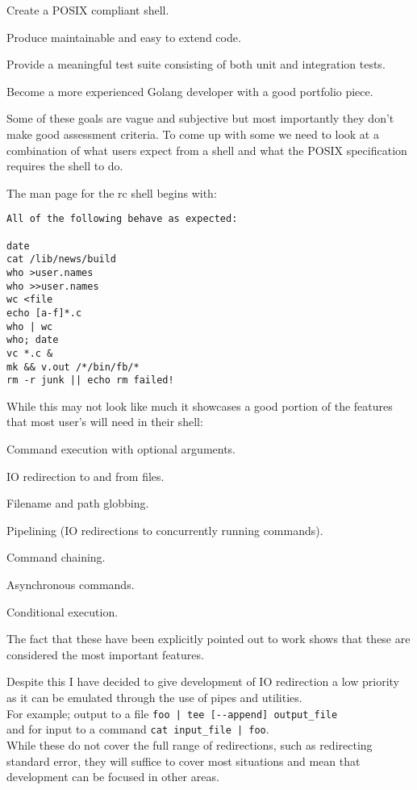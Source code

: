 \begin{itemize*}
    \item Create a POSIX\cite{POSIX-SHELL-STANDARD} compliant shell.
    \item Produce maintainable and easy to extend code.
    \item Provide a meaningful test suite consisting of both unit and integration tests.
    \item Become a more experienced Golang developer with a good portfolio piece.
\end{itemize*}

Some of these goals are vague and subjective but most importantly they don't make good assessment criteria.
To come up with some we need to look at a combination of what users expect from a shell and what the POSIX specification requires the shell to do.

The man page for the rc shell begins with:
\begin{lstlisting}
All of the following behave as expected:

date
cat /lib/news/build
who >user.names
who >>user.names
wc <file
echo [a-f]*.c
who | wc
who; date
vc *.c &
mk && v.out /*/bin/fb/*
rm -r junk || echo rm failed!
\end{lstlisting}

While this may not look like much it showcases a good portion of the features that most user's will need in their shell:
\begin{itemize*}
    \item Command execution with optional arguments.
    \item IO redirection to and from files.
    \item Filename and path globbing.
    \item Pipelining (IO redirections to concurrently running commands).
    \item Command chaining.
    \item Asynchronous commands.
    \item Conditional execution.
\end{itemize*}
The fact that these have been explicitly pointed out to work shows that these are considered the most important features.

Despite this I have decided to give development of IO redirection a low priority as it can be emulated through the use of pipes and utilities. \\
For example; output to a file \verb!foo | tee [--append] output_file! \\
and for input to a command \verb!cat input_file | foo!.\\
While these do not cover the full range of redirections, such as redirecting standard error, they will suffice to cover most situations and mean that development can be focused in other areas.

